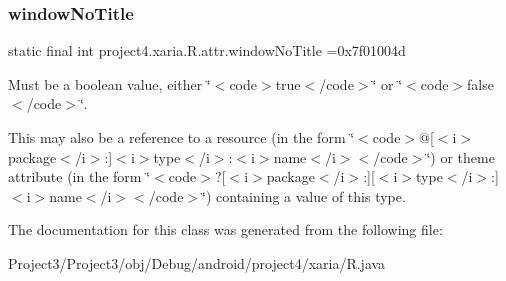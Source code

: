 \subsubsection{\texorpdfstring{window\+No\+Title}{windowNoTitle}}
{\footnotesize\ttfamily static final int project4.\+xaria.\+R.\+attr.\+window\+No\+Title =0x7f01004d\hspace{0.3cm}{\ttfamily [static]}}

Must be a boolean value, either \char`\"{}$<$code$>$true$<$/code$>$\char`\"{} or \char`\"{}$<$code$>$false$<$/code$>$\char`\"{}. 

This may also be a reference to a resource (in the form \char`\"{}$<$code$>$@\mbox{[}$<$i$>$package$<$/i$>$\+:\mbox{]}$<$i$>$type$<$/i$>$\+:$<$i$>$name$<$/i$>$$<$/code$>$\char`\"{}) or theme attribute (in the form \char`\"{}$<$code$>$?\mbox{[}$<$i$>$package$<$/i$>$\+:\mbox{]}\mbox{[}$<$i$>$type$<$/i$>$\+:\mbox{]}$<$i$>$name$<$/i$>$$<$/code$>$\char`\"{}) containing a value of this type. 

The documentation for this class was generated from the following file\+:\begin{DoxyCompactItemize}
\item 
Project3/\+Project3/obj/\+Debug/android/project4/xaria/R.\+java\end{DoxyCompactItemize}

